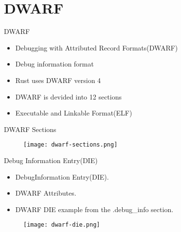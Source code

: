 \section{DWARF}

\begin{frame}{DWARF}
    \begin{itemize}
	    \item Debugging with Attributed Record Formats(DWARF)
	    \item Debug information format
	    \item Rust uses DWARF version 4
	    \item DWARF is devided into 12 sections
	    \item Executable and Linkable Format(ELF)
    \end{itemize}
\end{frame}


\begin{frame}{DWARF Sections}
	\begin{figure}
		\texttt{[image: dwarf-sections.png]}
	\end{figure}
\end{frame}


\begin{frame}{Debug Information Entry(DIE)}
	\begin{itemize}
	    \item DebugInformation Entry(DIE).
	    \item DWARF Attributes.
	    \item DWARF DIE example from the .debug\_info section.
	\end{itemize}
	\begin{figure}
		\texttt{[image: dwarf-die.png]}
	\end{figure}
\end{frame}


